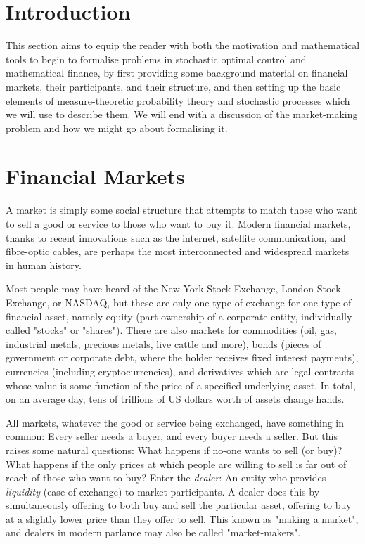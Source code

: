 \section{Introduction}
This section aims to equip the reader with both the motivation and mathematical tools to begin to formalise problems in stochastic optimal control 
and mathematical finance, by first providing some background material on financial markets, their participants, and their structure, 
and then setting up the basic elements of measure-theoretic probability theory and stochastic processes which we will use to describe them. 
We will end with a discussion of the market-making problem and how we might go about formalising it.
\section{Financial Markets}
A market is simply some social structure that attempts to match those who want to sell a good or service to those who want to buy it. 
Modern financial markets, thanks to recent innovations such as the internet, satellite communication, and fibre-optic cables, 
are perhaps the most interconnected and widespread markets in human history. 

Most people may have heard of the New York Stock Exchange, London Stock Exchange, or NASDAQ, 
but these are only one type of exchange for one type of financial asset, namely equity 
(part ownership of a corporate entity, individually called "stocks" or "shares"). There are also markets for commodities 
(oil, gas, industrial metals, precious metals, live cattle and more), bonds (pieces of government or corporate debt, 
where the holder receives fixed interest payments), currencies (including cryptocurrencies), 
and derivatives which are legal contracts whose value is some function of the price of a specified underlying asset. 
In total, on an average day, tens of trillions of US dollars worth of assets change hands.

All markets, whatever the good or service being exchanged, have something in common: Every seller needs a buyer, 
and every buyer needs a seller. But this raises some natural questions: What happens if no-one wants to sell (or buy)? 
What happens if the only prices at which people are willing to sell is far out of reach of those who want to buy? 
Enter the \textit{dealer}: An entity who provides \textit{liquidity} (ease of exchange) to market participants. 
A dealer does this by simultaneously offering to both buy and sell the particular asset, offering to buy at a slightly lower price than they offer to sell. 
This known as "making a market", and dealers in modern parlance may also be called "market-makers".

